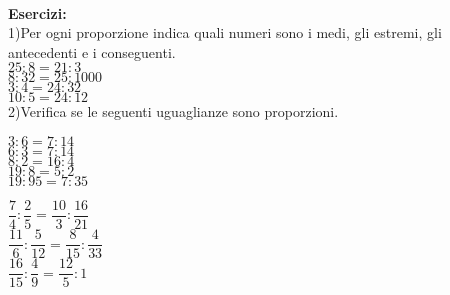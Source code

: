 \documentclass[14pt]{extarticle}
\begin{document}
\\

\large{\textbf{Esercizi:}}\\
1)Per ogni proporzione indica quali numeri sono i medi, gli estremi, gli antecedenti e i conseguenti.\\

\(25:8=21:3\)\\
\(8:32=25:1000\)\\
\(3:4=24:32\)\\
\(10:5=24:12\)\\

2)Verifica se le seguenti uguaglianze sono proporzioni.\\

\begin{minipage}[t]{0.5\textwidth}
\(3:6=7:14\)\\
\(6:3=7:14\)\\
\(8:2=16:4\)\\
\(19:8=5:2\)\\
\(19:95=7:35\)\\
\end{minipage}
\begin{minipage}[t]{0.5\textwidth}
\begin{spacing}{2.1}
\(\dfrac{7}{4}:\dfrac{2}{5}=\dfrac{10}{3}:\dfrac{16}{21}\)\\
\(\dfrac{11}{6}:\dfrac{5}{12}=\dfrac{8}{15}:\dfrac{4}{33}\)\\
\(\dfrac{16}{15}:\dfrac{4}{9}=\dfrac{12}{5}:1\)\\
\end{spacing}
\end{minipage}
\end{document}
